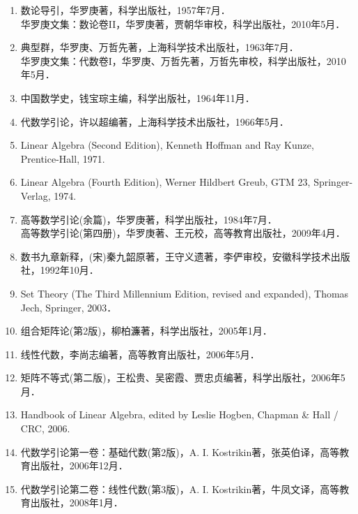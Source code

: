 \documentclass[a4paper,fontset=windows]{ctexbook}
\def\cyr{\tencyr\cyracc}
\theoremstyle{definition}
\begin{document}
\begin{enumerate}
\item 数论导引，华罗庚著，科学出版社，1957年7月．\\
华罗庚文集：数论卷II，华罗庚著，贾朝华审校，科学出版社，2010年5月．

\item 典型群，华罗庚、万哲先著，上海科学技术出版社，1963年7月．\\
华罗庚文集：代数卷I，华罗庚、万哲先著，万哲先审校，科学出版社，2010年5月．

\item 中国数学史，钱宝琮主编，科学出版社，1964年11月．

\item 代数学引论，许以超编著，上海科学技术出版社，1966年5月．

\item Linear Algebra (Second Edition), Kenneth Hoffman and Ray Kunze, Prentice-Hall, 1971.

\item Linear Algebra (Fourth Edition), Werner Hildbert Greub, GTM 23, Springer-Verlag, 1974.

\item 高等数学引论(余篇)，华罗庚著，科学出版社，1984年7月．\\
高等数学引论(第四册)，华罗庚著、王元校，高等教育出版社，2009年4月．

\item 数书九章新释，(宋)秦九韶原著，王守义遗著，李俨审校，安徽科学技术出版社，1992年10月．

\item Set Theory (The Third Millennium Edition, revised and expanded), Thomas Jech, Springer, 2003．

\item 组合矩阵论(第2版)，柳柏濂著，科学出版社，2005年1月．

\item 线性代数，李尚志编著，高等教育出版社，2006年5月．

\item 矩阵不等式(第二版)，王松贵、吴密霞、贾忠贞编著，科学出版社，2006年5月．

\item Handbook of Linear Algebra, edited by Leslie Hogben, Chapman \& Hall / CRC, 2006.

\item 代数学引论第一卷：基础代数(第2版)，{\cyr A. I. Kostrikin}著，张英伯译，高等教育出版社，2006年12月．

\item 代数学引论第二卷：线性代数(第3版)，{\cyr A. I. Kostrikin}著，牛凤文译，高等教育出版社，2008年1月．


\end{enumerate}
\end{document}
